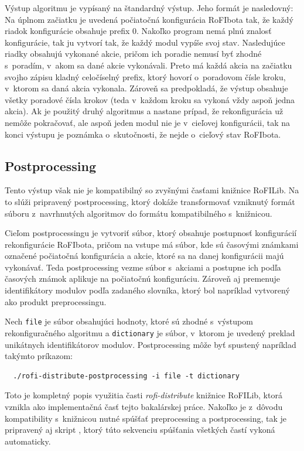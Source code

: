 \documentclass[
  printed, %
  oneside, %
  notable,   %
  nolof,     %
  nolot,     %
]{fithesis3}
\begin{document}
Výstup algoritmu je vypísaný na štandardný výstup. Jeho formát je nasledovný: Na úplnom začiatku je uvedená počiatočná konfigurácia RoFIbota tak, že každý riadok konfigurácie obsahuje prefix $0$. Nakoľko program nemá plnú znalosť konfigurácie, tak ju vytvorí tak, že každý modul vypíše svoj stav. Nasledujúce riadky obsahujú vykonané akcie, pričom ich poradie nemusí byť zhodné s~poradím, v~akom sa dané akcie vykonávali. Preto má každá akcia na začiatku svojho zápisu kladný celočíselný prefix, ktorý hovorí o~poradovom čísle kroku, v~ktorom sa daná akcia vykonala. Zároveň sa predpokladá, že výstup obsahuje všetky poradové čísla krokov (teda v~každom kroku sa vykoná vždy aspoň jedna akcia). Ak je použitý druhý algoritmus a nastane prípad, že rekonfigurácia už nemôže pokračovať, ale aspoň jeden modul nie je v~cieľovej konfigurácii, tak na konci výstupu je poznámka o~skutočnosti, že nejde o~cieľový stav RoFIbota. 

\subsection{Postprocessing}
Tento výstup však nie je kompatibilný so zvyšnými časťami knižnice RoFILib. Na to slúži pripravený postprocessing, ktorý dokáže transformovať vzniknutý formát súboru z~navrhnutých algoritmov do formátu kompatibilného s~knižnicou. 

Cieľom postprocessingu je vytvoriť súbor, ktorý obsahuje postupnosť konfigurácií rekonfigurácie RoFIbota, pričom na vstupe má súbor, kde sú časovými známkami označené počiatočná konfigurácia a akcie, ktoré sa na danej konfigurácii majú vykonávať. Teda postprocessing vezme súbor s~akciami a postupne ich podľa časových známok aplikuje na počiatočnú konfiguráciu. Zároveň aj premenuje identifikátory modulov podľa zadaného slovníka, ktorý bol napríklad vytvorený ako produkt preprocessingu. 

Nech \texttt{file} je súbor obsahujúci hodnoty, ktoré sú zhodné s~výstupom rekonfiguračného algoritmu a \texttt{dictionary} je súbor, v~ktorom je uvedený preklad unikátnych identifikátorov modulov. Postprocessing môže byť spustený napríklad takýmto príkazom: 
\begin{verbatim}
  ./rofi-distribute-postprocessing -i file -t dictionary
\end{verbatim}

Toto je kompletný popis využitia časti \textit{rofi-distribute} knižnice RoFILib, ktorá vznikla ako implementačná časť tejto bakalárskej práce. Nakoľko je z~dôvodu kompatibility s~knižnicou nutné spúšťať preprocessing a postprocessing, tak je pripravený aj skript , ktorý túto sekvenciu spúšťania všetkých častí vykoná automaticky. 
\end{document}
